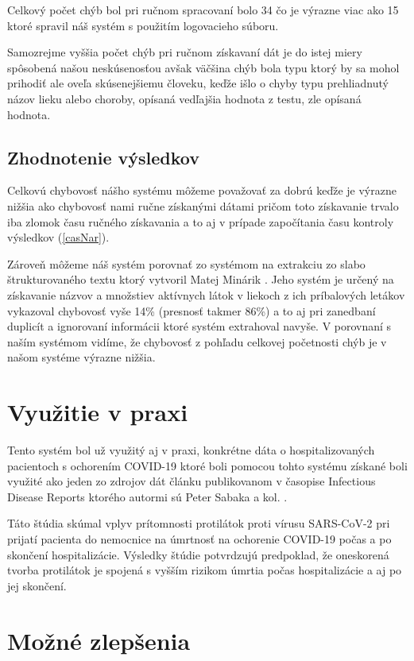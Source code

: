 Celkový počet chýb bol pri ručnom spracovaní bolo 34 čo je výrazne viac ako 15 ktoré spravil náš systém s použitím logovacieho súboru.  

Samozrejme vyššia počet chýb pri ručnom získavaní dát je do istej miery spôsobená našou neskúsenosťou avšak väčšina chýb bola typu ktorý by sa mohol prihodiť ale oveľa skúsenejšiemu človeku, keďže išlo o chyby typu prehliadnutý názov lieku alebo choroby, opísaná vedľajšia hodnota z testu, zle opísaná hodnota.

 
\subsection{Zhodnotenie výsledkov}

Celkovú chybovosť nášho systému môžeme považovať za dobrú keďže je výrazne nižšia ako chybovosť nami ručne získanými dátami pričom toto získavanie trvalo iba zlomok času ručného získavania a to aj v prípade započítania času kontroly výsledkov (\ref{casNar}).

Zároveň môžeme náš systém porovnať zo systémom na extrakciu zo slabo štrukturovaného textu ktorý vytvoril Matej Minárik \cite{extrSlabo}. Jeho systém je určený na získavanie názvov a množstiev aktívnych látok v liekoch z ich príbalových letákov vykazoval chybovosť vyše 14\% (presnosť takmer 86\%) a to aj pri zanedbaní duplicít a ignorovaní informácii ktoré systém extrahoval navyše. V porovnaní s naším systémom vidíme, že chybovosť z pohľadu celkovej početnosti chýb je v našom systéme výrazne nižšia. 


\section{Využitie v praxi}

Tento systém bol už využitý aj v praxi, konkrétne dáta o hospitalizovaných pacientoch s ochorením COVID-19 ktoré boli pomocou tohto systému získané boli využité ako jeden zo zdrojov dát článku publikovanom v časopise Infectious Disease Reports ktorého autormi sú Peter Sabaka a kol. \cite{sabaka}.

Táto štúdia skúmal vplyv prítomnosti protilátok proti vírusu SARS-CoV-2 pri prijatí pacienta do nemocnice na úmrtnosť na ochorenie COVID-19 počas a po skončení hospitalizácie. Výsledky štúdie potvrdzujú predpoklad, že oneskorená tvorba protilátok je spojená s vyšším rizikom úmrtia počas hospitalizácie a aj po jej skončení. 

\section{Možné zlepšenia}

